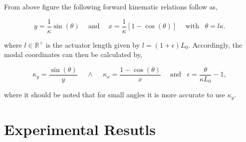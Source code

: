 From above figure the following forward kinematic relations follow as,


\begin{equation}
    y = \frac{1}{\kappa}\sin(\theta) \hspace{15pt} \text{and} \hspace{15pt}    x = \frac{1}{\kappa}[1-\cos(\theta)] \hspace{15pt} \text{with} \hspace{10pt}   \theta = l \kappa.
\end{equation}

where $l \in \mathbb{R}^{+}$ is the actuator length given by $l = (1+\epsilon)L_0$. Accordingly, the modal coordinates can then be calculated by,

\begin{equation}
    \kappa_y = \frac{\sin(\theta)}{y} \hspace{15pt} 	\land \hspace{15pt}  \kappa_x = \frac{1 -\cos(\theta)}{x} \hspace{15pt} \text{and} \hspace{10pt} \epsilon = \frac{\theta}{\kappa L_0} -1,
\end{equation}

where it should be noted that for small angles it is more accurate to use $\kappa_y$.

\section{Experimental Resutls}








